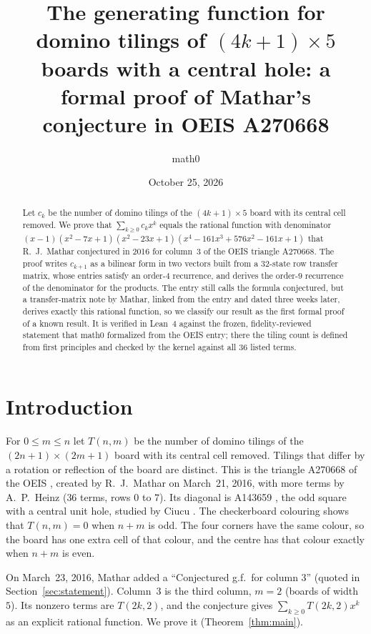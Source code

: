 \documentclass[11pt]{amsart}
\title[Domino tilings of $(4k+1)\times5$ boards with a central hole]{The generating function for domino tilings of $(4k+1)\times 5$ boards with a central hole: a formal proof of Mathar's conjecture in OEIS A270668}
\author{math0}
\date{October 25, 2026}
\theoremstyle{plain}
\theoremstyle{definition}
\begin{document}
\begin{abstract}
Let $c_k$ be the number of domino tilings of the $(4k+1)\times5$ board with its central cell removed.
We prove that $\sum_{k\ge0}c_kx^k$ equals the rational function with denominator $(x-1)(x^2-7x+1)(x^2-23x+1)(x^4-161x^3+576x^2-161x+1)$ that R.~J.~Mathar conjectured in 2016 for column~3 of the OEIS triangle A270668. The proof writes $c_{k+1}$ as a bilinear form in two vectors built from a $32$-state row transfer matrix, whose entries satisfy an order-$4$ recurrence, and derives the order-$9$ recurrence of the denominator for the products.
The entry still calls the formula conjectured, but a transfer-matrix note by Mathar, linked from the entry and dated three weeks later, derives exactly this rational function, so we classify our result as the first formal proof of a known result.
It is verified in Lean~4 against the frozen, fidelity-reviewed statement that math0 formalized from the OEIS entry; there the tiling count is defined from first principles and checked by the kernel against all $36$ listed terms.
\end{abstract}
\maketitle

\section{Introduction}

For $0\le m\le n$ let $T(n,m)$ be the number of domino tilings of the $(2n+1)\times(2m+1)$ board with its central cell removed. Tilings that differ by a rotation or reflection of the board are distinct. This is the triangle A270668 of the OEIS \cite{A270668}, created by R.~J.~Mathar on March~21, 2016, with more terms by A.~P.~Heinz ($36$ terms, rows $0$ to $7$). Its diagonal is A143659 \cite{A143659}, the odd square with a central unit hole, studied by Ciucu \cite{Ciucu}. The checkerboard colouring shows that $T(n,m)=0$ when $n+m$ is odd. The four corners have the same colour, so the board has one extra cell of that colour, and the centre has that colour exactly when $n+m$ is even.

On March~23, 2016, Mathar added a ``Conjectured g.f.\ for column 3'' (quoted in Section~\ref{sec:statement}). Column~3 is the third column, $m=2$ (boards of width $5$). Its nonzero terms are $T(2k,2)$, and the conjecture gives $\sum_{k\ge0}T(2k,2)x^k$ as an explicit rational function. We prove it (Theorem~\ref{thm:main}).
\end{document}
